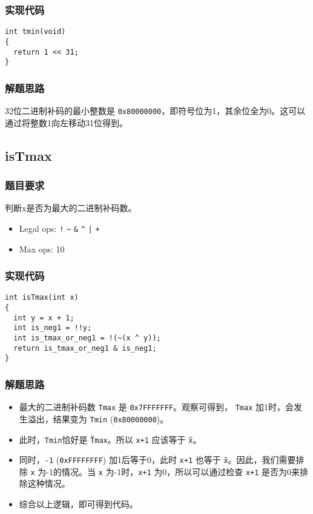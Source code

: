 \documentclass{article}
\begin{document}
\subsubsection{实现代码}
\begin{lstlisting}[caption={tmin}]
int tmin(void)
{
  return 1 << 31;
}
\end{lstlisting}

\subsubsection{解题思路}
32位二进制补码的最小整数是 \texttt{0x80000000}，即符号位为1，其余位全为0。这可以通过将整数1向左移动31位得到。

\subsection{isTmax}
\subsubsection{题目要求}
判断x是否为最大的二进制补码数。
\begin{itemize}
    \item Legal ops: \texttt{!} \texttt{\~{}} \texttt{\&} \texttt{\^{}} \texttt{|} \texttt{+}
    \item Max ops: 10
\end{itemize}

\subsubsection{实现代码}
\begin{lstlisting}[caption={isTmax}]
int isTmax(int x)
{
  int y = x + 1;
  int is_neg1 = !!y;
  int is_tmax_or_neg1 = !(~(x ^ y));
  return is_tmax_or_neg1 & is_neg1;
}
\end{lstlisting}

\subsubsection{解题思路}
\begin{itemize}
  \item 最大的二进制补码数 \texttt{Tmax} 是 \texttt{0x7FFFFFFF}。观察可得到， \texttt{Tmax} 加1时，会发生溢出，结果变为 \texttt{Tmin} (\texttt{0x80000000})。
  \item 此时，\texttt{Tmin}恰好是 \texttt{\~Tmax}。所以 \texttt{x+1} 应该等于 \texttt{\~x}。
  \item 同时，\texttt{-1} (\texttt{0xFFFFFFFF}) 加1后等于0，此时 \texttt{x+1} 也等于 \texttt{\~x}。因此，我们需要排除 \texttt{x} 为-1的情况。当 \texttt{x} 为-1时，\texttt{x+1} 为0，所以可以通过检查 \texttt{x+1} 是否为0来排除这种情况。
  \item 综合以上逻辑，即可得到代码。
\end{itemize}
\end{document}
